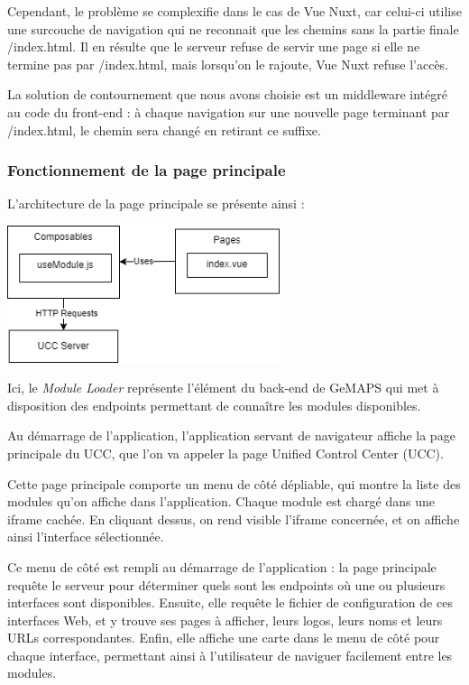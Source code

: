 \documentclass[francais]{rapportPFE}  %
\begin{document}
    Cependant, le problème se complexifie dans le cas de Vue Nuxt, car celui-ci utilise une surcouche de navigation qui ne reconnait que les chemins sans la partie finale /index.html. Il en résulte que le serveur refuse de servir une page si elle ne termine pas par /index.html, mais lorsqu'on le rajoute, Vue Nuxt refuse l'accès.

    La solution de contournement que nous avons choisie est un middleware intégré au code du front-end : à chaque navigation sur une nouvelle page terminant par /index.html, le chemin sera changé en retirant ce suffixe.






\subsubsection{Fonctionnement de la page principale}

L'architecture de la page principale se présente ainsi :

\begin{center}
    \centering
    \centering
    \includegraphics[width=8cm]{graphics/uccnuxt.png}
    \label{fig:test1}
\end{center}

Ici, le \textit{Module Loader} représente l'élément du back-end de GeMAPS qui met à disposition des endpoints permettant de connaître les modules disponibles.

Au démarrage de l'application, l'application servant de navigateur affiche la page principale du UCC, que l'on va appeler la page Unified Control Center (UCC).

Cette page principale comporte un menu de côté dépliable, qui montre la liste des modules qu'on affiche dans l'application. Chaque module est chargé dans une iframe cachée. En cliquant dessus, on rend visible l'iframe concernée, et on affiche ainsi l'interface sélectionnée.

Ce menu de côté est rempli au démarrage de l'application : la page principale requête le serveur pour déterminer quels sont les endpoints où une ou plusieurs interfaces sont disponibles. Ensuite, elle requête le fichier de configuration de ces interfaces Web, et y trouve ses pages à afficher, leurs logos, leurs noms et leurs URLs correspondantes. Enfin, elle affiche une carte dans le menu de côté pour chaque interface, permettant ainsi à l'utilisateur de naviguer facilement entre les modules.
\end{document}

